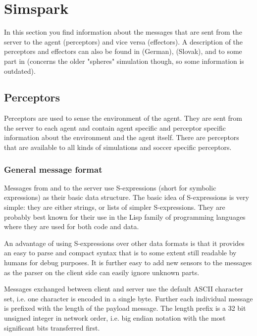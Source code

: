 \chapter{Simspark}
\label{cha:simspark}

In this section you find information about the messages that are sent from the
server to the agent (perceptors) and vice versa (effectors). A description of
the perceptors and effectors can also be found in \cite{SchillingJ} (German), \cite{Lekavy} (Slovak), and to some part in \cite{Vorst06} (concerns the older "spheres" simulation though, so some information is outdated).

\section{Perceptors}
\label{sec:perceptors}

Perceptors are used to sense the environment of the agent. They are sent from
the server to each agent and contain agent specific and perceptor specific
information about the environment and the agent itself. There are perceptors
that are available to all kinds of simulations and soccer specific perceptors.

\subsection{General message format}
\label{sec:msgformat}

Messages from and to the server use S-expressions (short for symbolic
expressions) as their basic data structure. The basic idea of
S-expressions is very simple: they are either strings, or lists of
simpler S-expressions.  They are probably best known for their use in
the Lisp family of programming languages where they are used for both
code and data.

An advantage of using S-expressions over other data formats is that it
provides an easy to parse and compact syntax that is to some extent
still readable by humans for debug purposes. It is further easy to add
new sensors to the messages as the parser on the client side can
easily ignore unknown parts.

Messages exchanged between client and server use the default ASCII
character set, i.e. one character is encoded in a single byte. Further
each individual message is prefixed with the length of the payload
message. The length prefix is a 32 bit unsigned integer in network
order, i.e. big endian notation with the most significant bits
transferred first.

